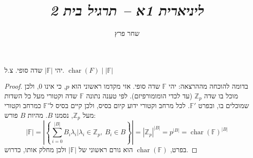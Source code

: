 \documentclass[]{article}
\author{שחר פרץ}
\title{\textit{ליניארית 1א – תרגיל בית 2}}
\newcommand\Z     {\mathbb{Z}}
\DeclareMathOperator{\chr}    {char}
\newcommand\F         {\mathbb{F}}
\newcommand\sof[1]    {\left | #1 \right |}
\begin{document}
	\maketitle
	\section{}
	יהי $|\F|$ שדה סופי. צ.ל. $\chr(F) \mid |\F|$
	\begin{proof}בדומה להוכחה מההרצאה: יהי $\F$ שדה סופי. אזי מקדמו ראשוני הוא $p$, כי אינו $0$, ולכן מוכל בו שדה $\Z_p$ (עד לכדי הומומורפיזם). לפי טענה נתונה $\F$ שדה וקטורי מעל כל השדות שמוכלים בו, ובפרט $\F'$. לכל מרחב וקטורי ידוע קיום בסיס, ולכן קיים בסיס ל־$\F$ כמרחב וקטורי מעל $\Z_p$, נסמנו $B$. מהיות $B$ פורש: 
		\[ \sof{\F} = \sof{\left\{\sum_{i = 0}^{|B|}B_i\lambda_i \Big\vert \lambda_i \in \Z_p, \ B_i \in B \right\}} = |\Z_p|^{|B|} = p^{|B|} = \chr(\F)^{|B|} \]
		בפרט, $\chr(\F)$ הוא גורם ראשוני של $\sof{\F}$ ולכן מחלק אותו, כדרוש. 
	\end{proof}
\end{document}
